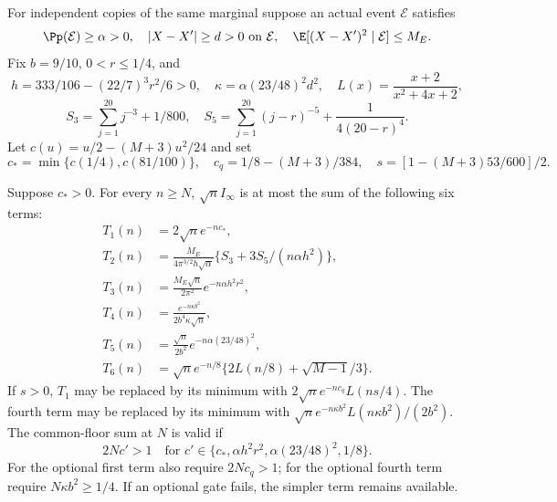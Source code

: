 For independent copies of the same marginal suppose an actual event
$\mathcal E$ satisfies
\[
 \Pp(\mathcal E)\ge\alpha>0,\quad |X-X'|\ge d>0\text{ on }\mathcal E,
 \quad\E[(X-X')^2\mid\mathcal E]\le M_E.
\]
Fix $b=9/10$, $0<r\le1/4$, and
\[
 h=333/106-(22/7)^3r^2/6>0,\quad
 \kappa=\alpha(23/48)^2d^2,\quad L(x)=\frac{x+2}{x^2+4x+2},
\]
\[
 S_3=\sum_{j=1}^{20}j^{-3}+1/800,\quad
 S_5=\sum_{j=1}^{20}(j-r)^{-5}+\frac1{4(20-r)^4}.
\]
Let $c(u)=u/2-(M+3)u^2/24$ and set
\[
 c_* =\min\{c(1/4),c(81/100)\},\quad
 c_q=1/8-(M+3)/384,\quad s=[1-(M+3)53/600]/2.
\]
\begin{proposition}\label{j:fourier:high}
Suppose $c_*>0$. For every $n\ge N$, $\sqrt n I_\infty$ is at most
the sum of the following six terms:
\begin{align*}
 T_1(n)&=2\sqrt n e^{-nc_*},\\
 T_2(n)&=\frac{M_E}{4\pi^{3/2}h\sqrt\alpha}
       \{S_3+3S_5/(n\alpha h^2)\},\\
 T_3(n)&=\frac{M_E\sqrt n}{2\pi^2}e^{-n\alpha h^2r^2},\\
 T_4(n)&=\frac{e^{-n\kappa b^2}}{2b^4\kappa\sqrt n},\\
 T_5(n)&=\frac{\sqrt n}{2b^2}e^{-n\alpha(23/48)^2},\\
 T_6(n)&=\sqrt n e^{-n/8}\{2L(n/8)+\sqrt{M-1}/3\}.
\end{align*}
If $s>0$, $T_1$ may be replaced by its minimum with
$2\sqrt n e^{-nc_q}L(ns/4)$. The fourth term may be replaced by
its minimum with $\sqrt n e^{-n\kappa b^2}L(n\kappa b^2)/(2b^2)$.
The common-floor sum at $N$ is valid if
\[
 2Nc'>1\quad\text{for }c'\in\{c_*,\alpha h^2r^2,
                      \alpha(23/48)^2,1/8\}.
\]
For the optional first term also require $2Nc_q>1$; for the optional
fourth term require $N\kappa b^2\ge1/4$. If an optional gate fails,
the simpler term remains available.
\end{proposition}
